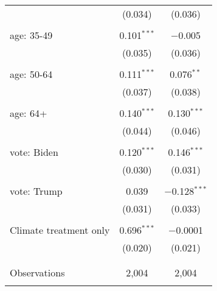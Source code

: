 \begin{tabular}{@{\extracolsep{5pt}}lcc}
  & (0.034) & (0.036) \\ 
  & & \\ 
 age: 35-49 & 0.101$^{***}$ & $-$0.005 \\ 
  & (0.035) & (0.036) \\ 
  & & \\ 
 age: 50-64 & 0.111$^{***}$ & 0.076$^{**}$ \\ 
  & (0.037) & (0.038) \\ 
  & & \\ 
 age: 64+ & 0.140$^{***}$ & 0.130$^{***}$ \\ 
  & (0.044) & (0.046) \\ 
  & & \\ 
 vote: Biden & 0.120$^{***}$ & 0.146$^{***}$ \\ 
  & (0.030) & (0.031) \\ 
  & & \\ 
 vote: Trump & 0.039 & $-$0.128$^{***}$ \\ 
  & (0.031) & (0.033) \\ 
  & & \\ 
 Climate treatment only & 0.696$^{***}$ & $-$0.0001 \\ 
  & (0.020) & (0.021) \\ 
  & & \\ 
\hline \\[-1.8ex] 

Observations & 2,004 & 2,004 \\ 
\hline 
\hline \\[-1.8ex] 
\end{tabular} 